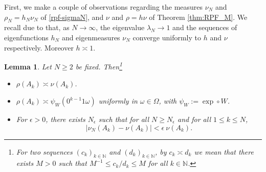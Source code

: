 \documentclass{amsart}
\newtheorem{lemma}[theorem]{Lemma}
\theoremstyle{definition}
\theoremstyle{remark}
\theoremstyle{definition}
\numberwithin{equation}{section}
\newcommand{\N}{\mathbb N}
\begin{document}
First, we make a couple of observations regarding the measures $\nu_{N}$ and $\rho_N=h_N\nu_N$ of \eqref{rpf-sigmaN}, and $\nu$ and $\rho=h\nu$ of Theorem \ref{thm:RPF_M}. We recall due to \cite{Is} that, as $N \to \infty$, the eigenvalue $\lambda_{N} \to 1$ and the sequences of eigenfunctions $h_{N}$ and eigenmeasures $\nu_{N}$ converge uniformly to $h$ and $\nu$ respectively. Moreover $h \asymp 1$.

\begin{lemma} \label{lem-utile}
Let $N \ge 2$ be fixed. Then\footnote{For two sequences $(c_{k})_{k \in \N}$ and $(d_{k})_{k \in \N}$, by $c_{k} \asymp d_{k}$ we mean that there exists $M > 0$ such that $M^{-1} \le c_{k}/d_{k} \le M$ for all $k \in \N$.}
\begin{itemize}
        \item[(i)] $\rho(A_{k}) \asymp \nu(A_{k})$. 
        \item[(ii)] $\rho(A_{k}) \asymp \psi_{W}(0^{k-1}1\omega) $ uniformly in $\omega \in \Omega$, with $\psi_W:= \exp\circ W$.
        \item[(iii)] For $\epsilon > 0$, there exists $N_{\epsilon}$ such that for all $N \ge N_{\epsilon}$ and for all $1 \le k \le N$,
        \[
            \big|\nu_{N}(A_{k}) - \nu(A_{k}) \big| < \epsilon \ \nu(A_{k}).
        \]
\end{itemize}
\end{lemma}
\end{document}
